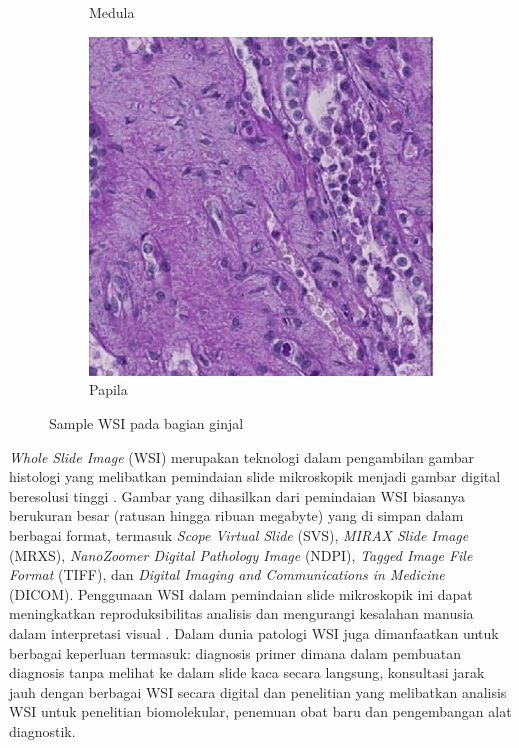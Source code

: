 \begin{figure}[H]
\begin{subfigure}[b]{0.3\textwidth}
		\caption{Medula}
		\label{fig:medula}
	\end{subfigure}
	\hfill
	\begin{subfigure}[b]{0.3\textwidth}
		\centering
		\includegraphics[width=\textwidth]{gambar/papila.png}
		\caption{Papila}
		\label{fig:papila}
	\end{subfigure}
	\caption{Sample WSI pada bagian ginjal}
	\label{fig:ginjal}
\end{figure}

\noindent \textit{Whole Slide Image} (WSI) merupakan teknologi dalam pengambilan gambar histologi yang melibatkan pemindaian slide mikroskopik menjadi gambar digital beresolusi tinggi \cite{hanna_whole_2020}. Gambar yang dihasilkan dari pemindaian WSI biasanya berukuran besar (ratusan hingga ribuan megabyte) yang di simpan dalam berbagai format, termasuk \textit{Scope Virtual Slide} (SVS), \textit{MIRAX Slide Image} (MRXS), \textit{NanoZoomer Digital Pathology Image} (NDPI), \textit{Tagged Image File Format} (TIFF), dan \textit{Digital Imaging and Communications in Medicine }(DICOM). Penggunaan WSI dalam pemindaian slide mikroskopik ini dapat meningkatkan reproduksibilitas analisis dan mengurangi kesalahan manusia dalam interpretasi visual \cite{li_hardware-software_2023}. Dalam dunia patologi WSI juga dimanfaatkan untuk berbagai keperluan termasuk: diagnosis primer dimana dalam pembuatan diagnosis tanpa melihat ke dalam slide kaca secara langsung, konsultasi jarak jauh dengan berbagai WSI secara digital dan penelitian yang melibatkan analisis WSI untuk penelitian biomolekular, penemuan obat baru dan pengembangan alat diagnostik.


